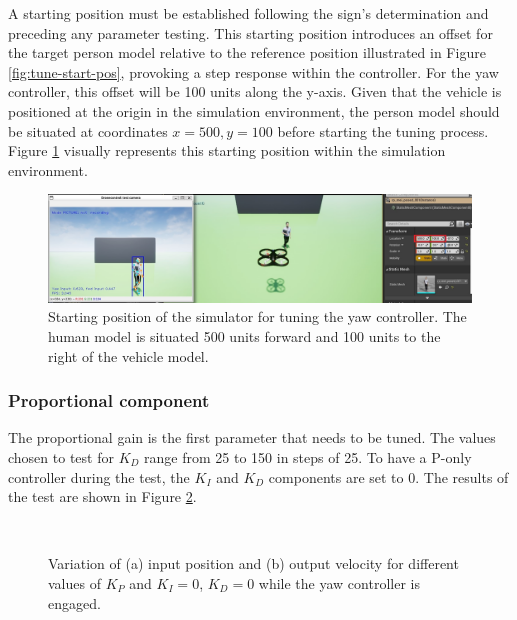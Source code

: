 A starting position must be established following the sign's determination and preceding any parameter testing. This starting position introduces an offset for the target person model relative to the reference position illustrated in Figure \ref{fig:tune-start-pos}, provoking a step response within the controller. For the yaw controller, this offset will be 100 units along the y-axis. Given that the vehicle is positioned at the origin in the simulation environment, the person model should be situated at coordinates $x=500, y=100$ before starting the tuning process. Figure \ref{fig:tune-ref-pos-yaw} visually represents this starting position within the simulation environment.

\begin{figure}[H]
  \centering
  \includegraphics[width=\textwidth, keepaspectratio]{img/pid/tune-ref-pos-yaw.jpg}
  \caption{Starting position of the simulator for tuning the yaw controller. The human model is situated 500 units forward and 100 units to the right of the vehicle model.}
  \label{fig:tune-ref-pos-yaw}
\end{figure}

\subsubsection{Proportional component}

The proportional gain is the first parameter that needs to be tuned. The values chosen to test for $K_D$ range from 25 to 150 in steps of 25. To have a P-only controller during the test, the $K_I$ and $K_D$ components are set to 0. The results of the test are shown in Figure \ref{fig:tune-yaw-prop}.


\begin{figure}[H]
    \begin{minipage}[t]{0.5\linewidth}
        \centering
        \scalebox{0.55}{}
    \end{minipage}
    \begin{minipage}[t]{0.5\linewidth}
        \centering
        \scalebox{0.55}{}
    \end{minipage}
    \\
    \begin{minipage}[t]{0.5\linewidth}
        \centering
        \scalebox{0.55}{}
    \end{minipage}
    \begin{minipage}[t]{0.5\linewidth}
        \centering
        \scalebox{0.55}{}
    \end{minipage}
    \label{fig:tune-yaw-prop}
    \caption{Variation of (a) input position and (b) output velocity for different values of $K_{P}$ and $K_I=0$, $K_D=0$ while the yaw controller is engaged.}
\end{figure}


